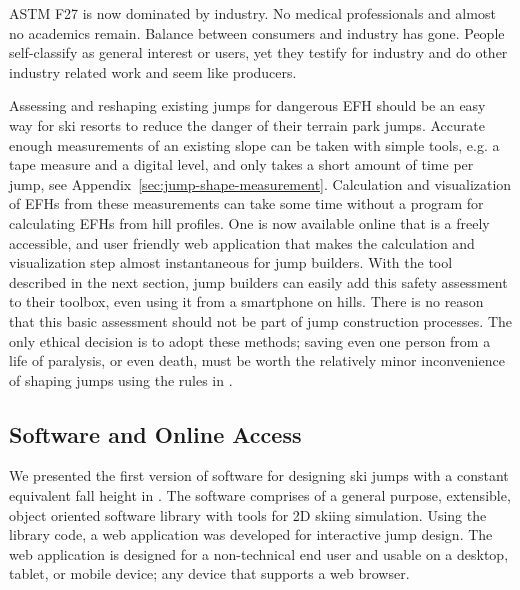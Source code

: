 \documentclass[smallextended]{svjour3}       %
\begin{document}

ASTM F27 is now dominated by industry. No medical professionals and almost no academics remain. Balance between consumers and industry has gone.  People self-classify as general interest or users, yet they testify for industry and do other industry related work and seem like producers. 

Assessing and reshaping existing jumps for dangerous EFH should be an easy way
for ski resorts to reduce the danger of their terrain park jumps. Accurate
enough measurements of an existing slope can be taken with simple tools, e.g. a
tape measure and a digital level, and only takes a short amount of time per
jump, see Appendix~\ref{sec:jump-shape-measurement}.  Calculation and
visualization of EFHs  from these measurements can take some time without a
program for calculating EFHs from hill profiles. One is now available online
that is a freely accessible, and user friendly web application that makes the
calculation and visualization step almost instantaneous for jump builders. With
the tool described in the next section, jump builders can easily add this
safety assessment to their toolbox, even using it from a smartphone on hills.
There is no reason that this basic assessment should not be part of jump
construction processes. The only ethical decision is to adopt these methods;
saving even one person from a life of paralysis, or even death, must be worth
the relatively minor inconvenience of shaping jumps using the rules in
\cite{Levy2015}.


\subsection{Software and Online Access}
\label{sec:software}
%
We presented the first version of software for designing ski jumps with a
constant equivalent fall height in \cite{Moore2018}. The software comprises of
a general purpose, extensible, object oriented software library with tools for
2D skiing simulation. Using the library code, a web application was developed
for interactive jump design. The web application is designed for a
non-technical end user and usable on a desktop, tablet, or mobile device; any
device that supports a web browser.
\end{document}
